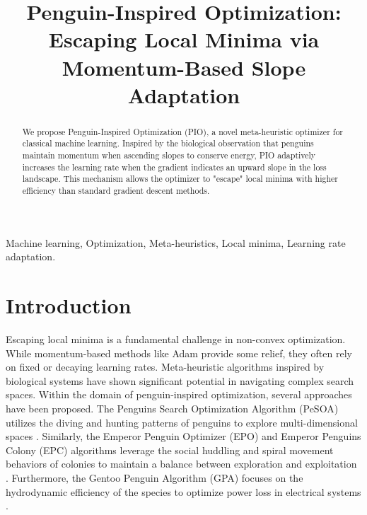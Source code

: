 \documentclass[conference]{IEEEtran}
\begin{document}
\title{Penguin-Inspired Optimization: Escaping Local Minima via Momentum-Based Slope Adaptation}

\author{
\and
{}
}

\maketitle

\begin{abstract}
We propose Penguin-Inspired Optimization (PIO), a novel meta-heuristic optimizer for classical machine learning. Inspired by the biological observation that penguins maintain momentum when ascending slopes to conserve energy, PIO adaptively increases the learning rate when the gradient indicates an upward slope in the loss landscape. This mechanism allows the optimizer to "escape" local minima with higher efficiency than standard gradient descent methods.
\end{abstract}

\begin{IEEEkeywords}
Machine learning, Optimization, Meta-heuristics, Local minima, Learning rate adaptation.
\end{IEEEkeywords}

\section{Introduction}
Escaping local minima is a fundamental challenge in non-convex optimization. While momentum-based methods like Adam provide some relief, they often rely on fixed or decaying learning rates. Meta-heuristic algorithms inspired by biological systems have shown significant potential in navigating complex search spaces. Within the domain of penguin-inspired optimization, several approaches have been proposed. The Penguins Search Optimization Algorithm (PeSOA) utilizes the diving and hunting patterns of penguins to explore multi-dimensional spaces \cite{gheraibia2013pesoa}. Similarly, the Emperor Penguin Optimizer (EPO) and Emperor Penguins Colony (EPC) algorithms leverage the social huddling and spiral movement behaviors of colonies to maintain a balance between exploration and exploitation \cite{dhiman2018epo, harifi2019epc}. Furthermore, the Gentoo Penguin Algorithm (GPA) focuses on the hydrodynamic efficiency of the species to optimize power loss in electrical systems \cite{palappan2020gpa}.
\end{document}
